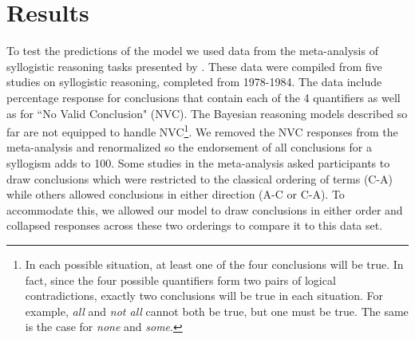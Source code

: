 \documentclass[10pt,letterpaper]{article}
\begin{document}


\section{Results}

To test the predictions of the model we used data from the meta-analysis of syllogistic reasoning tasks presented by . These data were compiled from five studies on syllogistic reasoning, completed from 1978-1984. The data include percentage response for conclusions that contain each of the 4 quantifiers as well as for ``No Valid Conclusion" (NVC). The Bayesian reasoning models described so far are not equipped to handle NVC\footnote{In each possible situation, at least one of the four conclusions will be true. In fact, since the four possible quantifiers form two pairs of logical contradictions, exactly two conclusions will be true in each situation.  For example, \emph{all} and \emph{not all} cannot both be true, but one must be true. The same is the case for \emph{none} and \emph{some}.}. We removed the NVC responses from the meta-analysis and renormalized so the endorsement of all conclusions for a syllogism adds to 100. Some studies in the meta-analysis asked participants to draw conclusions which were restricted to the classical ordering of terms (C-A) while others allowed conclusions in either direction (A-C or C-A). To accommodate this, we allowed our model to draw conclusions in either order and collapsed responses across these two orderings to compare it to this data set.
\end{document}
